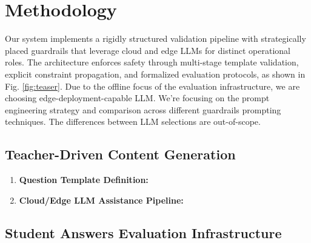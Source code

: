 \documentclass[sigconf]{acmart}
\begin{document}
\section{Methodology}

Our system implements a rigidly structured validation pipeline with strategically placed guardrails that leverage cloud and edge LLMs for distinct operational roles. The architecture enforces safety through multi-stage template validation, explicit constraint propagation, and formalized evaluation protocols, as shown in Fig. \ref{fig:teaser}. Due to the offline focus of the evaluation infrastructure, we are choosing edge-deployment-capable LLM. We're focusing on the prompt engineering strategy and comparison across different guardrails prompting techniques. The differences between LLM selections are out-of-scope.

\subsection{Teacher-Driven Content Generation}

\begin{enumerate}
    \item \textbf{Question Template Definition:}
    \item \textbf{Cloud/Edge LLM Assistance Pipeline:}
\end{enumerate}

\subsection{Student Answers Evaluation Infrastructure}
\end{document}
